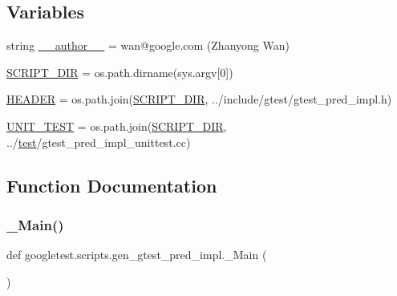 \subsection*{Variables}
\begin{DoxyCompactItemize}
\item 
string \mbox{\hyperlink{namespacegoogletest_1_1scripts_1_1gen__gtest__pred__impl_ad288b3a1d70e0ce7487d6f1b146d1b73}{\+\_\+\+\_\+author\+\_\+\+\_\+}} = \textquotesingle{}wan@google.\+com (Zhanyong Wan)\textquotesingle{}
\item 
\mbox{\hyperlink{namespacegoogletest_1_1scripts_1_1gen__gtest__pred__impl_a5c80a5c6472115a9c5b15f18254df8cd}{S\+C\+R\+I\+P\+T\+\_\+\+D\+IR}} = os.\+path.\+dirname(sys.\+argv\mbox{[}0\mbox{]})
\item 
\mbox{\hyperlink{namespacegoogletest_1_1scripts_1_1gen__gtest__pred__impl_a1f90e2c67827c45c51d0fece1322b13c}{H\+E\+A\+D\+ER}} = os.\+path.\+join(\mbox{\hyperlink{namespacegoogletest_1_1scripts_1_1gen__gtest__pred__impl_a5c80a5c6472115a9c5b15f18254df8cd}{S\+C\+R\+I\+P\+T\+\_\+\+D\+IR}}, \textquotesingle{}../include/gtest/gtest\+\_\+pred\+\_\+impl.\+h\textquotesingle{})
\item 
\mbox{\hyperlink{namespacegoogletest_1_1scripts_1_1gen__gtest__pred__impl_aae5f18b95e40b267265d18f1c6b792ce}{U\+N\+I\+T\+\_\+\+T\+E\+ST}} = os.\+path.\+join(\mbox{\hyperlink{namespacegoogletest_1_1scripts_1_1gen__gtest__pred__impl_a5c80a5c6472115a9c5b15f18254df8cd}{S\+C\+R\+I\+P\+T\+\_\+\+D\+IR}}, \textquotesingle{}../\mbox{\hyperlink{_mutual_8h_a707ee03719e99670bf6cfdfd897b8456}{test}}/gtest\+\_\+pred\+\_\+impl\+\_\+unittest.\+cc\textquotesingle{})
\end{DoxyCompactItemize}


\subsection{Function Documentation}
\mbox{\label{namespacegoogletest_1_1scripts_1_1gen__gtest__pred__impl_a1a2a54c1392ab53994303c43ba0ee9d3}} 
\subsubsection{\texorpdfstring{\_Main()}{\_Main()}}
{\footnotesize\ttfamily def googletest.\+scripts.\+gen\+\_\+gtest\+\_\+pred\+\_\+impl.\+\_\+\+Main (\begin{DoxyParamCaption}{ }\end{DoxyParamCaption})\hspace{0.3cm}{\ttfamily [private]}}

